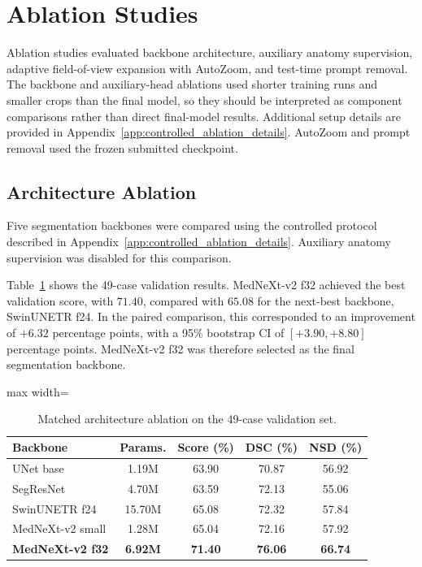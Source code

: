 \section{Ablation Studies}
\label{sec:ablation_studies}

Ablation studies evaluated backbone architecture, auxiliary anatomy supervision, adaptive field-of-view expansion with AutoZoom, and test-time prompt removal. The backbone and auxiliary-head ablations used shorter training runs and smaller crops than the final model, so they should be interpreted as component comparisons rather than direct final-model results. Additional setup details are provided in Appendix~\ref{app:controlled_ablation_details}. AutoZoom and prompt removal used the frozen submitted checkpoint.


\subsection{Architecture Ablation}
\label{sec:architecture_ablation}

Five segmentation backbones were compared using the controlled protocol described in Appendix~\ref{app:controlled_ablation_details}. Auxiliary anatomy supervision was disabled for this comparison.

Table~\ref{tab:architecture_ablation_main} shows the 49-case validation results. MedNeXt-v2 f32 achieved the best validation score, with \(71.40\), compared with \(65.08\) for the next-best backbone, SwinUNETR f24. In the paired comparison, this corresponded to an improvement of \(+6.32\) percentage points, with a 95\% bootstrap CI of \([+3.90,+8.80]\) percentage points. MedNeXt-v2 f32 was therefore selected as the final segmentation backbone.

\begin{table}[htbp]
\centering
\caption{
Matched architecture ablation on the 49-case validation set.
}
\label{tab:architecture_ablation_main}
\begin{adjustbox}{max width=\linewidth}
\begin{tabular}{lcccc}
\toprule
\textbf{Backbone} & \textbf{Params.} & \textbf{Score (\%)} & \textbf{DSC (\%)} & \textbf{NSD (\%)} \\
\midrule
UNet base         & 1.19M  & 63.90 & 70.87 & 56.92 \\
SegResNet         & 4.70M  & 63.59 & 72.13 & 55.06 \\
SwinUNETR f24     & 15.70M & 65.08 & 72.32 & 57.84 \\
MedNeXt-v2 small  & 1.28M  & 65.04 & 72.16 & 57.92 \\
\textbf{MedNeXt-v2 f32}
                  & \textbf{6.92M}
                  & \textbf{71.40}
                  & \textbf{76.06}
                  & \textbf{66.74} \\
\bottomrule
\end{tabular}
\end{adjustbox}
\end{table}

